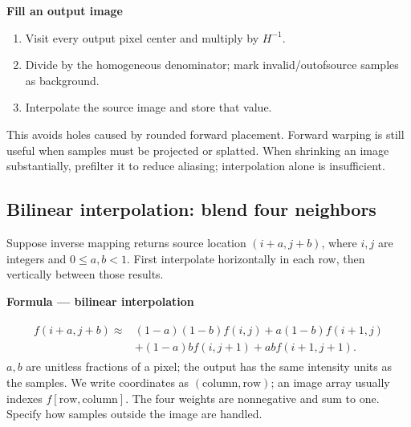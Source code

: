 \documentclass[letterpaper,11pt,english,openany,oneside]{jupyterBook}
\begin{document}
\begin{TextbookBox}
\textbf{Fill an output image}\par\smallskip
\begin{enumerate}
%
\item {}
\sphinxAtStartPar
Visit every output pixel center and multiply by \(H^{-1}\).

\item {}
\sphinxAtStartPar
Divide by the homogeneous denominator; mark invalid/out\sphinxhyphen{}of\sphinxhyphen{}source samples as background.

\item {}
\sphinxAtStartPar
Interpolate the source image and store that value.

\end{enumerate}

\sphinxAtStartPar
This avoids holes caused by rounded forward placement. Forward warping is still useful when samples must be projected or splatted. When shrinking an image substantially, prefilter it to reduce aliasing; interpolation alone is insufficient.

\end{TextbookBox}


\subsection{Bilinear interpolation: blend four neighbors}
\label{\detokenize{lectures/lecture02/warping:bilinear-interpolation-blend-four-neighbors}}
\sphinxAtStartPar
Suppose inverse mapping returns source location \((i+a,j+b)\), where \(i,j\) are integers and \(0\le a,b<1\). First interpolate horizontally in each row, then vertically between those results.

\begin{TextbookBox}
\textbf{Formula — bilinear interpolation}\par\smallskip
\begin{equation}\label{equation:lectures/lecture02/warping:eq-lec02-bilinear}
\begin{split}\begin{aligned}
f(i+a,j+b)\approx{}&(1-a)(1-b)f(i,j)+a(1-b)f(i+1,j)\\
&+(1-a)b f(i,j+1)+ab f(i+1,j+1).
\end{aligned}\end{split}
\end{equation}
\sphinxAtStartPar
\(a,b\) are unitless fractions of a pixel; the output has the same intensity units as the samples. We write coordinates as \((\text{column},\text{row})\); an image array usually indexes \(f[\text{row},\text{column}]\). The four weights are nonnegative and sum to one. Specify how samples outside the image are handled.

\end{TextbookBox}
\end{document}
